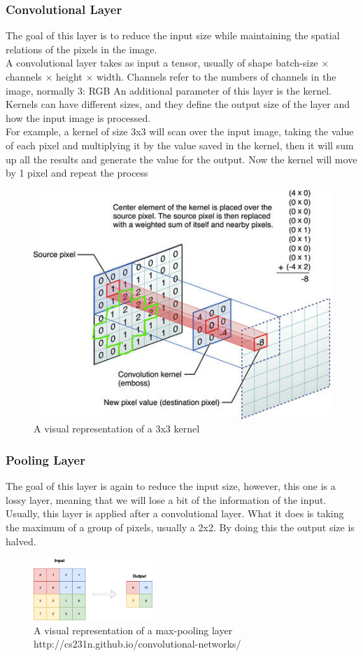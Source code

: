 \documentclass{usiinftr}
\begin{document}
\subsubsection{Convolutional Layer}
The goal of this layer is to reduce the input size while maintaining the spatial relations of the pixels in the image.\\
A convolutional layer takes as input a tensor, usually of shape batch-size $\times$ channels $\times$ height $\times$ width. Channels refer to the numbers of channels in the image, normally 3: RGB
An additional parameter of this layer is the kernel. Kernels can have different sizes, and they define the output size of the layer and how the input image is processed.\\
For example, a kernel of size 3x3 will scan over the input image, taking the value of each pixel and multiplying it by the value saved in the kernel, then it will sum up all the results and generate the value for the output. Now the kernel will move by 1 pixel and repeat the process

\begin{figure}[H]
	\centering
	\includegraphics[width=0.4\linewidth]{img/kernel}
	\caption{A visual representation of a 3x3 kernel}
	\label{fig:3}
\end{figure}

\subsubsection{Pooling Layer}
The goal of this layer is again to reduce the input size, however, this one is a lossy layer, meaning that we will lose a bit of the information of the input.
Usually, this layer is applied after a convolutional layer.
What it does is taking the maximum of a group of pixels, usually a 2x2. By doing this the output size is halved.
\begin{figure}[H]
	\centering
	\includegraphics[width=0.4\textwidth]{img/maxpool}
	\caption{A visual representation of a max-pooling layer http://cs231n.github.io/convolutional-networks/}
	\label{fig:4}
\end{figure}
\end{document}
